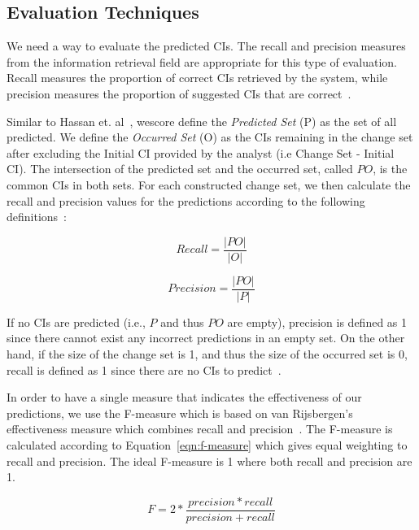 \documentclass{article}
\begin{document}
\subsection{Evaluation Techniques}

We need a way to evaluate the predicted CIs. The recall and precision measures from the information retrieval field are appropriate for this type of evaluation.
Recall measures the proportion of correct CIs retrieved by the system, while precision measures the proportion of suggested CIs that are correct~\cite{van79}.

Similar to Hassan et. al~\cite{hassan2004predicting}, wescore define the \textit{Predicted Set} (P) as the set of all predicted. We define the \textit{Occurred
Set} (O) as the CIs remaining in the change set after excluding the Initial CI
provided by the analyst (i.e Change Set - Initial CI). The intersection of the predicted set and the occurred set, called $PO$, is the common CIs in both sets.
For each constructed change set, we then calculate the recall and precision values for the predictions according to the following
definitions~\cite{hassan2004predicting}:

\begin{equation}
\label{eqn:recall}
Recall = \frac{|PO|}{|O|}
\end{equation}

\begin{equation}
\label{eqn:precision}
Precision = \frac{|PO|}{|P|}
\end{equation}

If no CIs are predicted (i.e., $P$ and thus $PO$ are empty), precision is defined as 1 since there cannot exist any incorrect predictions in an empty set. On
the other hand, if the size of the change set is 1, and thus the size of the occurred set is 0, recall is defined as 1 since there are no CIs to
predict~\cite{hassan2004predicting}.  

In order to have a single measure that indicates the effectiveness of our predictions, we use the F-measure which is based on van Rijsbergen's effectiveness
measure which combines recall and precision~\cite{van79}. The F-measure is calculated according to Equation~\ref{eqn:f-measure} which gives equal weighting to
recall and precision. The ideal F-measure is 1 where both recall and precision are 1.

\begin{equation}
F = 2 * \frac{precision * recall}{precision +recall}
\label{eqn:f-measure}
\end{equation}
\end{document}
